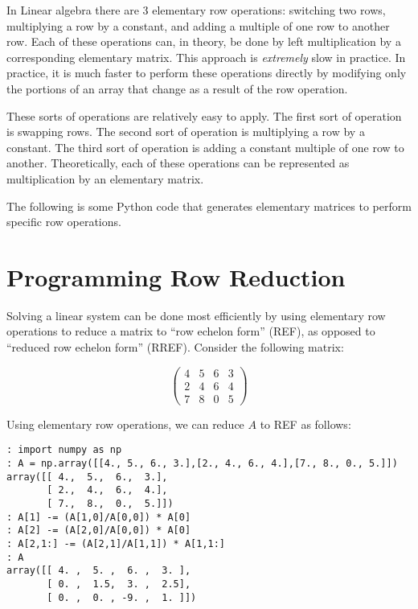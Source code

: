 \label{lab:LUdecomp}

In Linear algebra there are 3 elementary row operations: switching two rows, multiplying a row by a constant, and adding a multiple of one row to another row.
Each of these operations can, in theory, be done by left multiplication by a corresponding elementary matrix.
This approach is \emph{extremely} slow in practice.
In practice, it is much faster to perform these operations directly by modifying only the portions of an array that change as a result of the row operation.

These sorts of operations are relatively easy to apply.
The first sort of operation is swapping rows.
The second sort of operation is multiplying a row by a constant.
The third sort of operation is adding a constant multiple of one row to another.
Theoretically, each of these operations can be represented as multiplication by an elementary matrix.

The following is some Python code that generates elementary matrices to perform specific row operations.


\section*{Programming Row Reduction}

Solving a linear system can be done most efficiently by using elementary row operations to reduce a matrix to ``row echelon form'' (REF), as opposed to ``reduced row echelon form'' (RREF).
Consider the following matrix: 

\[
\begin{pmatrix}
4&5&6&3 \\
2&4&6&4 \\
7&8&0&5
\end{pmatrix}
\]

Using elementary row operations, we can reduce $A$ to REF as follows:
\begin{lstlisting}
: import numpy as np
: A = np.array([[4., 5., 6., 3.],[2., 4., 6., 4.],[7., 8., 0., 5.]])
array([[ 4.,  5.,  6.,  3.],
       [ 2.,  4.,  6.,  4.],
       [ 7.,  8.,  0.,  5.]])
: A[1] -= (A[1,0]/A[0,0]) * A[0]
: A[2] -= (A[2,0]/A[0,0]) * A[0]
: A[2,1:] -= (A[2,1]/A[1,1]) * A[1,1:]
: A
array([[ 4. ,  5. ,  6. ,  3. ],
       [ 0. ,  1.5,  3. ,  2.5],
       [ 0. ,  0. , -9. ,  1. ]])
\end{lstlisting}


